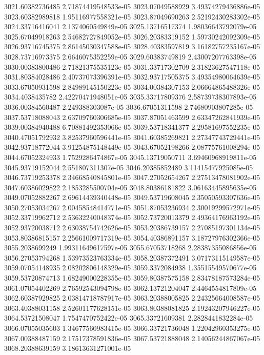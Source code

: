 {3021.60382736485 2.71874419548533e-05
3023.07049588929 3.49374279436886e-05
3023.60382989818 1.95116977558321e-05
3023.87049690263 2.52192430283302e-05
3024.33716416041 2.1374060549849e-05
3025.13716517374 1.98036643792079e-05
3025.67049918263 2.54682727849052e-05
3026.20383319152 1.59730242092309e-05
3026.93716745375 2.86145030347588e-05
3028.40383597819 3.16182757235167e-05
3028.73716973375 2.6646075352259e-05
3029.60383749819 2.43007207763398e-05
3030.00383800486 2.71821375535123e-05
3031.33717302709 2.31823627547118e-05
3031.80384028486 2.40737073396391e-05
3032.93717505375 3.49354980064639e-05
3033.67050931598 2.84989145150223e-05
3034.00384307153 2.06664865488326e-05
3034.4038435782 2.42270471948051e-05
3035.33717809376 2.58739738307893e-05
3036.00384560487 2.249388303087e-05
3036.67051311598 2.74680903807285e-05
3037.53718088043 2.63709760306685e-05
3037.87051463599 2.63347262841939e-05
3039.00384940488 6.70881492353066e-05
3039.53718341377 2.29581697552235e-05
3040.47051792932 3.82537960596441e-05
3041.60385269821 2.27347743729441e-05
3042.93718772044 3.91254875148449e-05
3043.67052198266 2.08775761008294e-05
3044.67052324933 1.7529286474867e-05
3045.13719050711 3.69460968919811e-05
3045.93719152044 2.551807311307e-05
3046.20385852489 3.11415477925085e-05
3046.73719253378 2.34668540845801e-05
3047.27052654267 2.27513478081902e-05
3047.60386029822 2.1853285500704e-05
3048.80386181822 3.06163445895635e-05
3049.07052882267 2.69614439340448e-05
3049.53719608045 2.35050593307636e-05
3050.27053034267 2.00458548414771e-05
3051.87053236934 2.30019299572971e-05
3052.33719962712 2.53632240048374e-05
3052.73720013379 2.49364176963192e-05
3052.93720038712 2.63038754742626e-05
3053.20386739157 2.27085197301134e-05
3053.80386815157 2.25661009717319e-05
3054.40386891157 3.18727976302366e-05
3055.2038699249 1.99311649617597e-05
3055.67053718268 2.28387355086856e-05
3056.27053794268 1.53973523763334e-05
3058.20387372491 3.07173115149587e-05
3059.07054148935 2.08202806148329e-05
3059.3372084938 1.35515549570677e-05
3059.53720874713 1.68249000228355e-05
3059.80387575158 2.83478187573284e-05
3061.07054402269 2.76592543094798e-05
3062.13721204047 2.4464554817809e-05
3062.60387929825 2.03814718787917e-05
3063.20388005825 2.24325664008587e-05
3063.40388031158 2.52601177628151e-05
3063.80388081825 2.19243207946227e-05
3064.53721508047 1.7547470752422e-05
3065.33721609381 2.2828441832284e-05
3066.07055035603 1.34677560983415e-05
3066.33721736048 1.22042960353275e-05
3067.00388487159 2.17517378591836e-05
3067.53721888048 2.14056244867067e-05
3068.20388639159 3.18613631271001e-05
}
